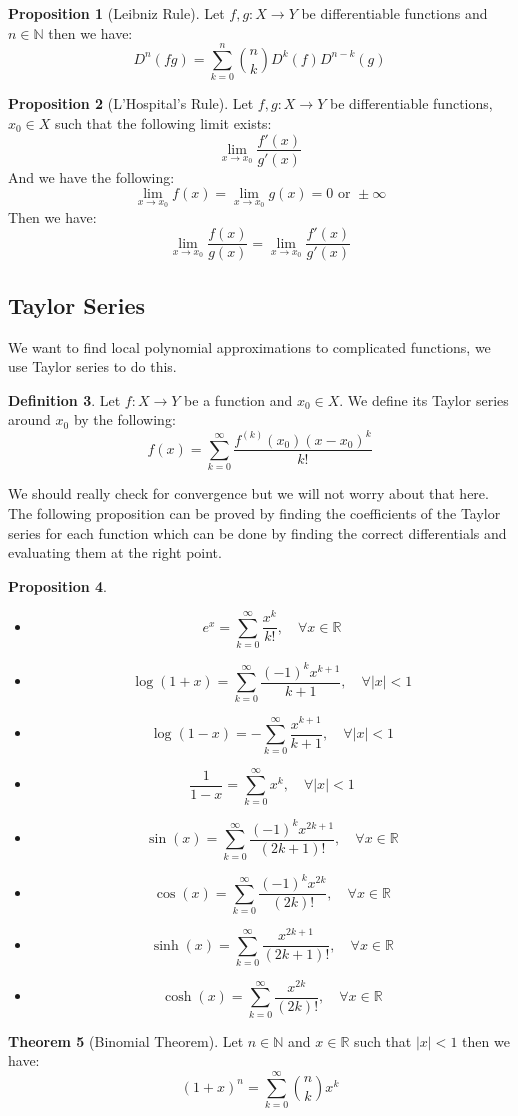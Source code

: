 \documentclass[11pt]{article}
\theoremstyle{definition}
\newtheorem{prop}{Proposition}[section]
\newtheorem{thm}[prop]{Theorem}
\newtheorem{defn}[prop]{Definition}
\newcommand{\brac}[1]{\left(#1\right)}
\newcommand{\abs}[1]{\left\lvert#1\right\rvert}
\newcommand{\N}{\mathbb{N}}
\newcommand{\R}{\mathbb{R}}
\begin{document}
	\begin{prop}[Leibniz Rule]
		Let $f,g:X\rightarrow Y$ be differentiable functions and $n\in\N$ then we have:
		$$D^n\brac{fg} = \sum_{k=0}^n \binom{n}{k}D^k\brac{f}D^{n-k}\brac{g}$$
	\end{prop}
	\begin{prop}[L'Hospital's Rule]
		Let $f,g:X\rightarrow Y$ be differentiable functions, $x_0\in X$ such that the following limit exists:
		$$\lim_{x\rightarrow x_0} \frac{f'\brac{x}}{g'\brac{x}}$$
		And we have the following:
		$$ \lim_{x\rightarrow x_0} f\brac{x} = \lim_{x\rightarrow x_0} g\brac{x} = 0 \text{ or } \pm \infty$$
		Then we have:
		$$\lim_{x\rightarrow x_0} \frac{f\brac{x}}{g\brac{x}}=\lim_{x\rightarrow x_0} \frac{f'\brac{x}}{g'\brac{x}}$$
	\end{prop}
\subsection{Taylor Series}
	We want to find local polynomial approximations to complicated functions, we use Taylor series to do this.
	\begin{defn}
		Let $f:X\rightarrow Y$ be a function and $x_0\in X$. We define its Taylor series around $x_0$ by the following:
		$$ f\brac{x} = \sum_{k=0}^{\infty} \frac{f^{\brac{k}}\brac{x_0}\brac{x-x_0}^k}{k!}$$
	\end{defn}
	We should really check for convergence but we will not worry about that here. The following proposition can be proved by finding the coefficients of the Taylor series for each function which can be done by finding the correct differentials and evaluating them at the right point.
	\begin{prop}
		\begin{itemize}
			\item $$ e^x = \sum_{k=0}^{\infty}\frac{x^k}{k!}, \quad \forall x\in \R$$
			\item $$ \log\brac{1+x} = \sum_{k=0}^{\infty} \frac{\brac{-1}^k x^{k+1}}{k+1}, \quad \forall \abs{x}<1$$
			\item $$\log\brac{1-x} = -\sum_{k=0}^{\infty}\frac{x^{k+1}}{k+1}, \quad \forall \abs{x}<1$$
			\item $$ \frac{1}{1-x} = \sum_{k=0}^{\infty} x^{k}, \quad \forall \abs{x}<1$$
			\item $$ \sin\brac{x} =\sum_{k=0}^{\infty} \frac{\brac{-1}^k x^{2k+1}}{\brac{2k+1}!}, \quad \forall x\in \R$$
			\item $$ \cos\brac{x} = \sum_{k=0}^{\infty} \frac{\brac{-1}^k x^{2k}}{\brac{2k}!}, \quad \forall x\in \R$$
			\item $$ \sinh\brac{x} =\sum_{k=0}^{\infty} \frac{ x^{2k+1}}{\brac{2k+1}!}, \quad \forall x\in \R$$
			\item $$ \cosh\brac{x} = \sum_{k=0}^{\infty} \frac{x^{2k}}{\brac{2k}!}, \quad \forall x\in \R$$
		\end{itemize}
	\end{prop}
	\begin{thm}[Binomial Theorem]
		Let $n\in\N$ and $x\in\R$ such that $\abs{x}<1$ then we have:
		$$ \brac{1+x}^n = \sum_{k=0}^{\infty} \binom{n}{k}x^{k}$$
	\end{thm}
\end{document}
